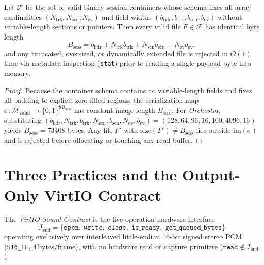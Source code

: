 \begin{theorem}
\label{thm:preread}
Let $\mathcal{F}$ be the set of valid binary session containers whose schema fixes all array cardinalities $(N_{\mathrm{trk}}, N_{\mathrm{scn}}, N_{\mathrm{ev}})$ and field widths $(b_{\mathrm{hdr}}, b_{\mathrm{trk}}, b_{\mathrm{scn}}, b_{\mathrm{ev}})$ without variable-length sections or pointers. Then every valid file $F \in \mathcal{F}$ has identical byte length
\begin{equation}
B_{\mathrm{sess}} = b_{\mathrm{hdr}} + N_{\mathrm{trk}} b_{\mathrm{trk}} + N_{\mathrm{scn}} b_{\mathrm{scn}} + N_{\mathrm{ev}} b_{\mathrm{ev}},
\end{equation}
and any truncated, oversized, or dynamically extended file is rejected in $O(1)$ time via metadata inspection (\texttt{stat}) prior to reading a single payload byte into memory.
\end{theorem}

\begin{proof}
Because the container schema contains no variable-length fields and fixes all padding to explicit zero-filled regions, the serialization map $\sigma : \mathcal{M}_{\mathrm{valid}} \to \{0,1\}^{8 B_{\mathrm{sess}}}$ has constant image length $B_{\mathrm{sess}}$. For \emph{Orchestra}, substituting $(b_{\mathrm{hdr}}, N_{\mathrm{trk}}, b_{\mathrm{trk}}, N_{\mathrm{scn}}, b_{\mathrm{scn}}, N_{\mathrm{ev}}, b_{\mathrm{ev}}) = (128, 64, 96, 16, 100, 4096, 16)$ yields $B_{\mathrm{sess}} = 73408$ bytes. Any file $F'$ with $\mathrm{size}(F') \ne B_{\mathrm{sess}}$ lies outside $\mathrm{im}(\sigma)$ and is rejected before allocating or touching any read buffer.
\end{proof}

\section{Three Practices and the Output-Only VirtIO Contract}

\begin{definition}
The \emph{VirtIO Sound Contract} is the five-operation hardware interface
\[
\mathcal{I}_{\mathrm{snd}} = \{\texttt{open},\; \texttt{write},\; \texttt{close},\; \texttt{is\_ready},\; \texttt{get\_queued\_bytes}\}
\]
operating exclusively over interleaved little-endian 16-bit signed stereo PCM (\texttt{S16\_LE}, $4\,\text{bytes/frame}$), with no hardware read or capture primitive ($\texttt{read} \notin \mathcal{I}_{\mathrm{snd}}$).
\end{definition}

